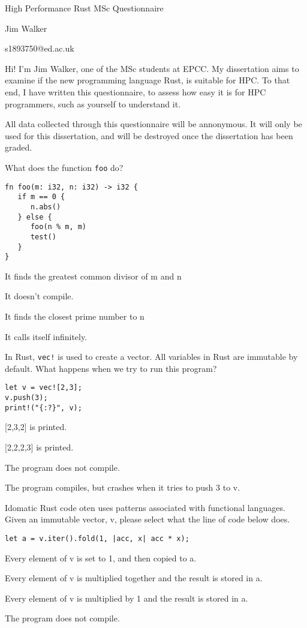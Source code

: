 \documentclass[11pt]{article} %
\newcommand*\choice{\item}
\begin{document}
\author{Jim Walker}
\begin{center}
\large {High Performance Rust MSc Questionnaire}

\normalsize Jim Walker

s1893750@ed.ac.uk
\end{center}

Hi! I'm Jim Walker, one of the MSc students at EPCC. My dissertation aims to examine if the new programming language Rust, is suitable for HPC. To that end, I have written this questionnaire, to assess how easy it is for HPC programmers, such as yourself to understand it.

All data collected through this questionnaire will be annonymous. It will only be used for this dissertation, and will be destroyed once the dissertation has been graded.

\begin{multiplechoice}[choices=1]
What does the function \texttt{foo} do?
\begin{lstlisting}
fn foo(m: i32, n: i32) -> i32 {
   if m == 0 {
      n.abs()
   } else {
      foo(n % m, m)
      test()
   }
}
\end{lstlisting}
  \choice It finds the greatest common divisor of m and n
  \choice It doesn't compile.
  \choice It finds the closest prime number to n
  \choice It calls itself infinitely.
\end{multiplechoice}

\begin{multiplechoice}[choices=1]
In Rust, \texttt{vec!} is used to create a vector. All variables in Rust are immutable by default. What happens when we try to run this program?
\begin{lstlisting}
let v = vec![2,3];
v.push(3);
print!("{:?}", v);
\end{lstlisting}

\choice {[2,3,2]} is printed.
\choice {[2,2,2,3]} is printed.
\choice The program does not compile.
\choice The program compiles, but crashes when it tries to push 3 to v.

\end{multiplechoice}


\begin{multiplechoice}[choices=1]
Idomatic Rust code oten uses patterns associated with functional languages. Given an immutable vector, v, please select what the line of code below does.
\begin{lstlisting}
let a = v.iter().fold(1, |acc, x| acc * x);
\end{lstlisting}
  \choice Every element of v is set to 1, and then copied to a.
  \choice Every element of v is multiplied together and the result is stored in a.
  \choice Every element of v is multiplied by 1 and the result is stored in a.
  \choice The program does not compile.
\end{multiplechoice}
\end{document}
